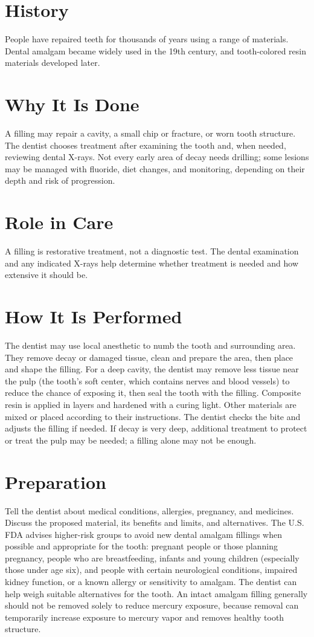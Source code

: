 \section*{History}
People have repaired teeth for thousands of years using a range of materials. Dental amalgam became widely used in the 19th century, and tooth-colored resin materials developed later.

\section*{Why It Is Done}
A filling may repair a cavity, a small chip or fracture, or worn tooth structure. The dentist chooses treatment after examining the tooth and, when needed, reviewing dental X-rays. Not every early area of decay needs drilling; some lesions may be managed with fluoride, diet changes, and monitoring, depending on their depth and risk of progression.

\section*{Role in Care}
A filling is restorative treatment, not a diagnostic test. The dental examination and any indicated X-rays help determine whether treatment is needed and how extensive it should be.

\section*{How It Is Performed}
The dentist may use local anesthetic to numb the tooth and surrounding area. They remove decay or damaged tissue, clean and prepare the area, then place and shape the filling. For a deep cavity, the dentist may remove less tissue near the pulp (the tooth's soft center, which contains nerves and blood vessels) to reduce the chance of exposing it, then seal the tooth with the filling. Composite resin is applied in layers and hardened with a curing light. Other materials are mixed or placed according to their instructions. The dentist checks the bite and adjusts the filling if needed. If decay is very deep, additional treatment to protect or treat the pulp may be needed; a filling alone may not be enough.

\section*{Preparation}
Tell the dentist about medical conditions, allergies, pregnancy, and medicines. Discuss the proposed material, its benefits and limits, and alternatives. The U.S. FDA advises higher-risk groups to avoid new dental amalgam fillings when possible and appropriate for the tooth: pregnant people or those planning pregnancy, people who are breastfeeding, infants and young children (especially those under age six), and people with certain neurological conditions, impaired kidney function, or a known allergy or sensitivity to amalgam. The dentist can help weigh suitable alternatives for the tooth. An intact amalgam filling generally should not be removed solely to reduce mercury exposure, because removal can temporarily increase exposure to mercury vapor and removes healthy tooth structure.

